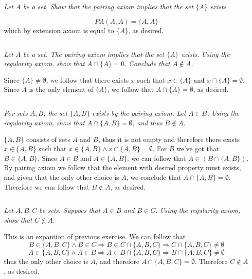 \documentclass[11pt,oneside,titlepage]{book}
\DeclareMathOperator \imp {\Rightarrow}
\begin{document}
\textit{Let $A$ be a set. Show that the pairing axiom implies that the set $\{A\}$ exists}

$$PA(A, A) = \{A, A\}$$
which by extension axiom is equal to $\{A\}$, as desired.

\subsection{}

\textit{Let $A$ be a set. The pairing axiom implies that the set $\{A\}$ exists. Using the
  regularity axiom, show that $A \cap \{A\} = 0$. Conclude that $A \notin A$.}

Since $\{A\} \neq \emptyset$, we follow that there exists $x$ such that $x \in \{A\}$ and
$x \cap \{A\} = \emptyset$. Since $A$ is the only element of $\{A\}$, we follow that
$A \cap \{A\} = \emptyset$, as desired.

\subsection{}

\textit{For sets $A, B$, the set $\{A, B\}$ exists by the pairing axiom. Let $A \in B$.
  Using the regularity axiom, show that $A \cap \{A, B\} = \emptyset$, and thus $B \notin A$.}

$\{A, B\}$ consists of sets $A$ and $B$, thus it is not empty and therefore
there exists $x \in \{A, B\}$ such that $x \in \{A, B\} \land x \cap \{A, B\} = \emptyset$.
For $B$ we've got that $B \in \{A, B\}$. Since $A \in B$ and $A \in \{A, B\}$, we can follow that
$A \in (B \cap \{A, B\})$. By pairing axiom we follow that the element with desired
property must exists, and given that the only other choice is $A$,
we conclude that $A \cap \{A, B\} = \emptyset$. Therefore we can follow that $B \notin A$, as
desired.

\subsection{}

\textit{Let $A, B, C$ be sets. Suppoes that $A \in B$ and $B \in C$. Using the regularity axiom,
  show that $C \notin A$.}

This is an expantion of previous exercise. We can follow that
$$B \in \{A, B, C\} \land B \in C \imp B \in C \cap \{A, B, C\} \imp C \cap \{A, B, C\}
\neq \emptyset$$
$$A \in \{A, B, C\} \land A \in B \imp A \in B \cap \{A, B, C\} \imp B \cap \{A, B, C\}
\neq \emptyset$$
thus the only other choice is $A$, and therefore $A \cap  \{A, B, C\} = \emptyset$. Therefore
$C \notin A$, as desired.
\end{document}
